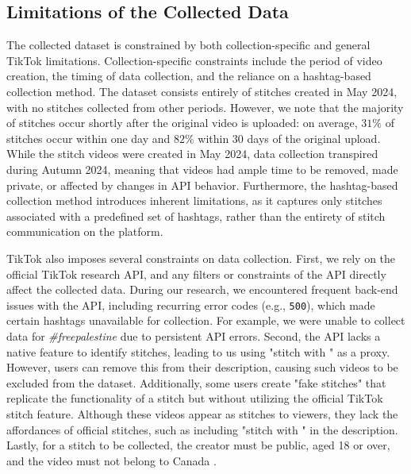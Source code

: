 

\subsection{Limitations of the Collected Data}
The collected dataset is constrained by both collection-specific and general TikTok limitations. Collection-specific constraints include the period of video creation, the timing of data collection, and the reliance on a hashtag-based collection method. The dataset consists entirely of stitches created in May 2024, with no stitches collected from other periods. However, we note that the majority of stitches occur shortly after the original video is uploaded: on average, $31\%$ of stitches occur within one day and $82\%$ within 30 days of the original upload. While the stitch videos were created in May 2024, data collection transpired during Autumn 2024, meaning that videos had ample time to be removed, made private, or affected by changes in API behavior. Furthermore, the hashtag-based collection method introduces inherent limitations, as it captures only stitches associated with a predefined set of hashtags, rather than the entirety of stitch communication on the platform. 

TikTok also imposes several constraints on data collection. First, we rely on the official TikTok research API, and any filters or constraints of the API directly affect the collected data. During our research, we encountered frequent back-end issues with the API, including recurring error codes (e.g., \texttt{500}), which made certain hashtags unavailable for collection. For example, we were unable to collect data for \textit{\#freepalestine} due to persistent API errors. Second, the API lacks a native feature to identify stitches, leading to us using "stitch with " as a proxy. However, users can remove this from their description, causing such videos to be excluded from the dataset. Additionally, some users create "fake stitches" that replicate the functionality of a stitch but without utilizing the official TikTok stitch feature. Although these videos appear as stitches to viewers, they lack the affordances of official stitches, such as including "stitch with " in the description. Lastly, for a stitch to be collected, the creator must be public, aged 18 or over, and the video must not belong to Canada \citep{tiktok_codebook}. 


